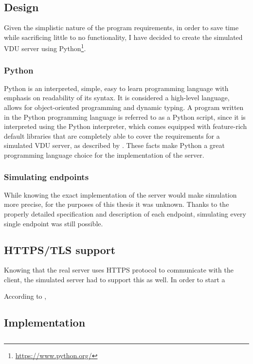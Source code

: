\subsection{Design}
Given the simplistic nature of the program requirements, in order to save time while sacrificing little to no functionality, I have decided to create the simulated VDU server using Python\footnote{\url{https://www.python.org/}}.

\subsubsection{Python}
Python is an interpreted, simple, easy to learn programming language with emphasis on readability of its syntax. It is considered a high-level language, allows for object-oriented programming and dynamic typing. A program written in the Python programming language is referred to as a Python script, since it is interpreted using the Python interpreter, which comes equipped with feature-rich default libraries that are completely able to cover the requirements for a simulated VDU server, as described by \cite{PythonWhatis}. These facts make Python a great programming language choice for the implementation of the server.
\subsubsection{Simulating endpoints}
 While knowing the exact implementation of the server would make simulation more precise, for the purposes of this thesis it was unknown. Thanks to the properly detailed specification and description of each endpoint, simulating every single endpoint was still possible.
 
 \subsection{HTTPS/TLS support}
Knowing that the real server uses HTTPS protocol to communicate with the client, the simulated server had to support this as well. In order to start a 

According to \cite{SSLCertTut},
 
\subsection{Implementation}



\subsection{}

